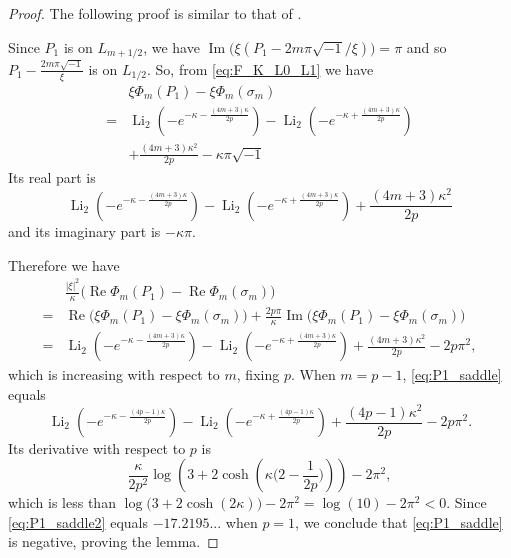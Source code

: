 \documentclass[a4paper,dvipdfmx]{amsart}
\theoremstyle{plain}
\theoremstyle{definition}
\theoremstyle{remark}
\newcommand{\Li}{\operatorname{Li}}
\renewcommand{\Re}{\operatorname{Re}}
\renewcommand{\Im}{\operatorname{Im}}
\renewcommand{\i}{\sqrt{-1}}
\newcommand{\saddle}{\sigma}
\numberwithin{equation}{section}
\begin{document}
\begin{proof}
The following proof is similar to that of \cite[Lemma~5.3]{Murakami:CANJM2023}.
\par
Since $P_1$ is on $L_{m+1/2}$, we have $\Im\bigl(\xi(P_1-2m\pi\i/\xi)\bigr)=\pi$ and so $P_1-\frac{2m\pi\i}{\xi}$ is on $L_{1/2}$.
So, from \eqref{eq:F_K_L0_L1} we have
\begin{align*}
  &\xi\Phi_m(P_1)-\xi\Phi_m(\saddle_m)
  \\
  =&
  \Li_2\left(-e^{-\kappa-\frac{(4m+3)\kappa}{2p}}\right)
  -
  \Li_2\left(-e^{-\kappa+\frac{(4m+3)\kappa}{2p}}\right)
  \\
  &+
  \frac{(4m+3)\kappa^2}{2p}-\kappa\pi\i
\end{align*}
Its real part is
\begin{equation*}
  \Li_2\left(-e^{-\kappa-\frac{(4m+3)\kappa}{2p}}\right)
  -
  \Li_2\left(-e^{-\kappa+\frac{(4m+3)\kappa}{2p}}\right)
  +
  \frac{(4m+3)\kappa^2}{2p}
\end{equation*}
and its imaginary part is $-\kappa\pi$.
\par
Therefore we have
\begin{equation}\label{eq:P1_saddle}
\begin{split}
  &\frac{|\xi|^2}{\kappa}
  \bigl(\Re\Phi_m(P_1)-\Re\Phi_m(\saddle_m)\bigr)
  \\
  =&
  \Re\bigl(\xi\Phi_m(P_1)-\xi\Phi_m(\saddle_m)\bigr)
  +
  \frac{2p\pi}{\kappa}
  \Im\bigl(\xi\Phi_m(P_1)-\xi\Phi_m(\saddle_m)\bigr)
  \\
  =&
  \Li_2\left(-e^{-\kappa-\frac{(4m+3)\kappa}{2p}}\right)
  -
  \Li_2\left(-e^{-\kappa+\frac{(4m+3)\kappa}{2p}}\right)
  +
  \frac{(4m+3)\kappa^2}{2p}
  -2p\pi^2,
\end{split}
\end{equation}
which is increasing with respect to $m$, fixing $p$.
When $m=p-1$, \eqref{eq:P1_saddle} equals
\begin{equation}\label{eq:P1_saddle2}
  \Li_2\left(-e^{-\kappa-\frac{(4p-1)\kappa}{2p}}\right)
  -
  \Li_2\left(-e^{-\kappa+\frac{(4p-1)\kappa}{2p}}\right)
  +
  \frac{(4p-1)\kappa^2}{2p}
  -2p\pi^2.
\end{equation}
Its derivative with respect to $p$ is
\begin{equation*}
  \frac{\kappa}{2p^2}
    \log\left(3+2\cosh\left(\kappa\bigl(2-\frac{1}{2p}\bigr)\right)\right)
  -2\pi^2,
\end{equation*}
which is less than $\log\bigl(3+2\cosh(2\kappa)\bigr)-2\pi^2=\log(10)-2\pi^2<0$.
Since \eqref{eq:P1_saddle2} equals $-17.2195...$ when $p=1$, we conclude that \eqref{eq:P1_saddle} is negative, proving the lemma.
\end{proof}
\end{document}
